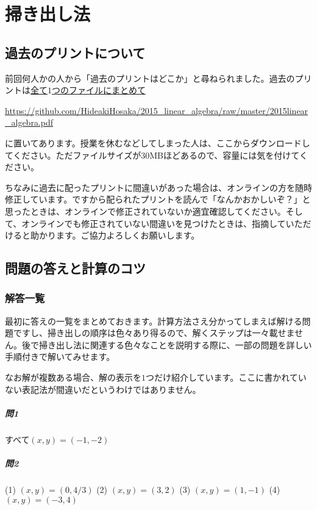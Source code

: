 \chapter{掃き出し法}


\section{過去のプリントについて}

前回何人かの人から「過去のプリントはどこか」と尋ねられました。過去のプリントは\uline{全て$1$つのファイルにまとめて}
\begin{center}
\url{https://github.com/HideakiHosaka/2015_linear_algebra/raw/master/2015linear_algebra.pdf}
\end{center}
に置いてあります。授業を休むなどしてしまった人は、ここからダウンロードしてください。ただファイルサイズが30MBほどあるので、容量には気を付けてください。

ちなみに過去に配ったプリントに間違いがあった場合は、オンラインの方を随時修正しています。ですから配られたプリントを読んで「なんかおかしいぞ？」と思ったときは、オンラインで修正されていないか適宜確認してください。そして、オンラインでも修正されていない間違いを見つけたときは、指摘していただけると助かります。ご協力よろしくお願いします。

\section{問題の答えと計算のコツ}

\subsection{解答一覧}

最初に答えの一覧をまとめておきます。計算方法さえ分かってしまえば解ける問題ですし、掃き出しの順序は色々あり得るので、解くステップは一々載せません。後で掃き出し法に関連する色々なことを説明する際に、一部の問題を詳しい手順付きで解いてみせます。

なお解が複数ある場合、解の表示を$1$つだけ紹介しています。ここに書かれていない表記法が間違いだというわけではありません。

\paragraph{問1} すべて$(x, y) = (-1, -2)$

\paragraph{問2}
(1) $(x, y) = (0, 4/3)$ \quad (2) $(x, y) = (3, 2)$ \quad (3) $(x, y) = (1, -1)$ \quad (4) $(x, y) = (-3, 4)$

